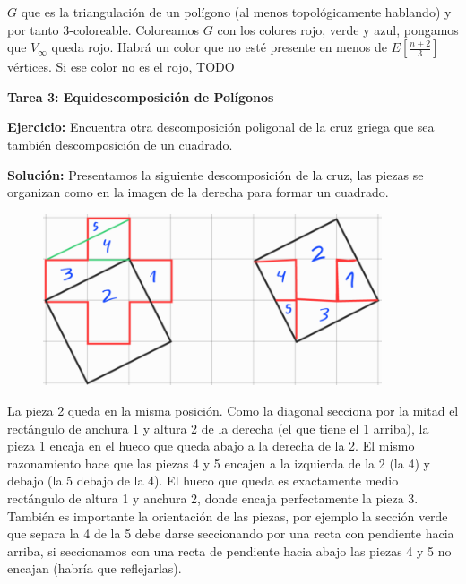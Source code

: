 \documentclass{amsart}
\begin{document}
 $G$ que es la triangulación de un polígono (al menos topológicamente hablando) y por tanto 3-coloreable. Coloreamos $G$ con los colores rojo, verde y azul, pongamos que $V_\infty$ queda rojo. Habrá un color que no esté presente en menos de $E[\frac{n+2}{3}]$ vértices. Si ese color no es el rojo, TODO

\bigskip

\begin{center}
	\textbf{\large Tarea 3: Equidescomposición de Polígonos}
\end{center}

\bigskip

\textbf{Ejercicio:} Encuentra otra descomposición poligonal de la cruz griega
que sea también descomposición de un cuadrado.

\bigskip

\textbf{Solución:} Presentamos la siguiente descomposición de la cruz, las piezas se organizan como en la imagen de la derecha para formar un cuadrado.

\begin{figure}[H]
	\includegraphics[width=100mm]{imgs/cruz-cuadrado}
\end{figure}

La pieza 2 queda en la misma posición. Como la diagonal secciona por la mitad el rectángulo de anchura 1 y altura 2 de la derecha (el que tiene el 1 arriba), la pieza 1 encaja en el hueco que queda abajo a la derecha de la 2. El mismo razonamiento hace que las piezas 4 y 5 encajen a la izquierda de la 2 (la 4) y debajo (la 5 debajo de la 4). El hueco que queda es exactamente medio rectángulo de altura 1 y anchura 2, donde encaja perfectamente la pieza 3. También es importante la orientación de las piezas, por ejemplo la sección verde que separa la 4 de la 5 debe darse seccionando por una recta con pendiente hacia arriba, si seccionamos con una recta de pendiente hacia abajo las piezas 4 y 5 no encajan (habría que reflejarlas).

\bigskip
\end{document}
